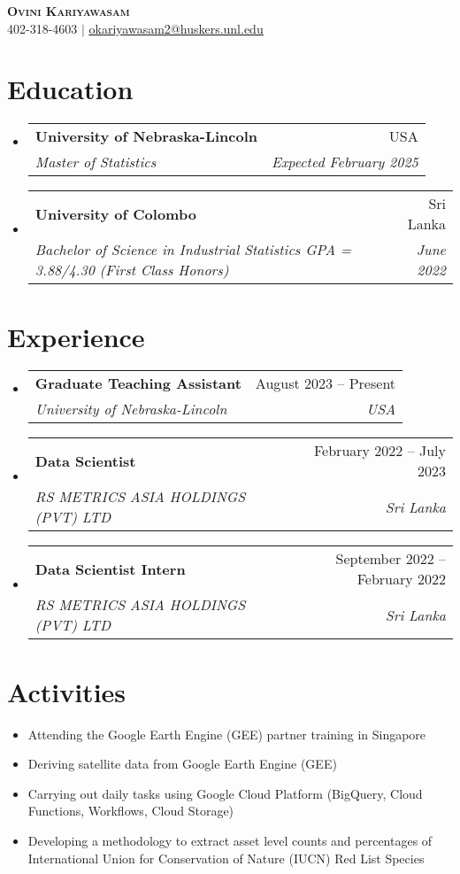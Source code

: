 \documentclass[letterpaper,11pt]{article}
\makeatletter
\newcommand{\resumeItem}[1]{
  \item\small{
    {#1 \vspace{-2pt}}
  }
}
\newcommand{\resumeSubheading}[4]{
  \vspace{-2pt}\item
    \begin{tabular*}{0.97\textwidth}[t]{l@{\extracolsep{\fill}}r}
      \textbf{#1} & #2 \\
      \textit{\small#3} & \textit{\small #4} \\
    \end{tabular*}\vspace{-7pt}
}
\newcommand{\resumeSubHeadingListStart}{\begin{itemize}[leftmargin=0.15in, label={}]}
\newcommand{\resumeSubHeadingListEnd}{\end{itemize}}
\newcommand{\resumeItemListStart}{\begin{itemize}}
\newcommand{\resumeItemListEnd}{\end{itemize}\vspace{-5pt}}
\makeatother
\begin{document}


\begin{center}
    \textbf{\Huge \scshape Ovini Kariyawasam} \\ \vspace{1pt}
    \small 402-318-4603 $|$ \href{mailto:x@xcom}
    {\underline{okariyawasam2@huskers.unl.edu}}  
\end{center}


\section{Education}
  \resumeSubHeadingListStart
    \resumeSubheading
      {University of Nebraska-Lincoln}{USA}
      {Master of Statistics}{Expected February 2025}
   \resumeSubheading
      {University of Colombo}{Sri Lanka}
      {Bachelor of Science in Industrial Statistics GPA = 3.88/4.30 (First Class Honors)}{June 2022}

  \resumeSubHeadingListEnd

\section{Experience}
  \resumeSubHeadingListStart

    \resumeSubheading
      {Graduate Teaching Assistant}{August 2023 – Present}
      {University of Nebraska-Lincoln}{USA}
    \resumeSubheading
      {Data Scientist}{February 2022 – July 2023}
      { RS METRICS ASIA HOLDINGS (PVT) LTD}{Sri Lanka}
  \resumeSubheading
      {Data Scientist Intern}{September 2022 – February 2022}
      { RS METRICS ASIA HOLDINGS (PVT) LTD}{Sri Lanka}
  
    \resumeSubHeadingListEnd

\section{Activities}
 
      \resumeItemListStart
        \resumeItem{Attending the Google Earth Engine (GEE) partner training in Singapore}
        \resumeItem{Deriving satellite data from Google Earth Engine (GEE)}
        \resumeItem{Carrying out daily tasks using Google Cloud Platform (BigQuery, Cloud Functions, Workflows, Cloud Storage)}
        \resumeItem{Developing a methodology to extract asset level counts and percentages of International Union for Conservation of Nature (IUCN) Red List Species }
      \resumeItemListEnd
      
\end{document}
